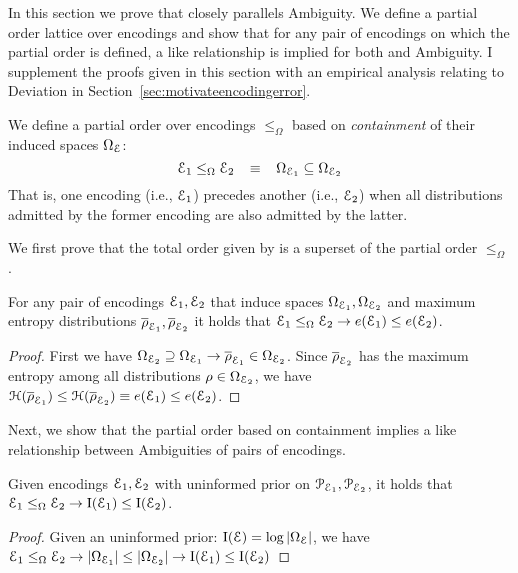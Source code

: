 In this section we prove that \errorname closely parallels Ambiguity. 
We define a partial order lattice over encodings and show that for any pair of encodings on which the partial order is defined, a like relationship is implied for both \errorname and Ambiguity.
I supplement the proofs given in this section with an empirical analysis relating \errorname to Deviation in Section~\ref{sec:motivateencodingerror}.

We define a partial order over encodings $\leq_\Omega$ based on \textit{containment} of their induced spaces $\Omega_\mathcal E$:
$$\mathcal E_1 \leq_\Omega \mathcal E_2\;\;\;\equiv\;\;\;\Omega_{\mathcal E_1} \subseteq \Omega_{\mathcal E_2}$$
That is, one encoding (i.e., $\mathcal E_1$) precedes another (i.e., $\mathcal E_2$) when all distributions admitted by the former encoding are also admitted by the latter.


We first prove that the total order given by \errorname is a superset of the partial order $\leq_\Omega$. 
\begin{lemma}
\label{prop:monotone}
For any pair of encodings $\mathcal E_1,\mathcal E_2$ that induce spaces $\Omega_{\mathcal E_1},\Omega_{\mathcal E_2}$ and maximum entropy distributions $\overline{\rho}_{\mathcal E_1},\overline{\rho}_{\mathcal E_2}$ it holds that $\mathcal E_1 \leq_\Omega \mathcal E_2\to e(\mathcal E_1)\leq e(\mathcal E_2)$. 
\end{lemma}
\begin{proof} 
First we have $\Omega_{\mathcal E_2}\supseteq \Omega_{\mathcal E_1}\to\overline{\rho}_{\mathcal E_1}\in\Omega_{\mathcal E_2}$. Since $\overline{\rho}_{\mathcal E_2}$ has the maximum entropy among all distributions $\rho\in\Omega_{\mathcal E_2}$, we have $\mathcal{H}(\overline{\rho}_{\mathcal E_1})\leq\mathcal{H}(\overline{\rho}_{\mathcal E_2})\equiv e(\mathcal E_1)\leq e(\mathcal E_2)$. 
\end{proof}


Next, we show that the partial order based on containment implies a like relationship between Ambiguities of pairs of encodings.
\begin{lemma}
\label{prop:containmentrepresentativeness}
Given encodings $\mathcal E_1,\mathcal E_2$ with uninformed prior on $\mathcal{P}_{\mathcal E_1},\mathcal{P}_{\mathcal E_2}$, it holds that $\mathcal E_1 \leq_\Omega \mathcal E_2\to \text{I}(\mathcal E_1)\leq \text{I}(\mathcal E_2)$.
\end{lemma}
\begin{proof}
Given an uninformed prior: $\text{I}(\mathcal E)=\log|\Omega_\mathcal E|$, we have $\mathcal E_1 \leq_\Omega \mathcal E_2\to|\Omega_{\mathcal E_1}|\leq|\Omega_{\mathcal E_2}|\to \text{I}(\mathcal E_1)\leq \text{I}(\mathcal E_2)$ 
\end{proof}

